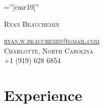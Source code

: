 \documentclass[a4paper, 9pt]{article} %
\begin{document}
\pagestyle{empty} %

\font\fb=''[cmr10]'' %

\vspace{-10pt}
\par{\huge \textsc{Ryan Beauchemin}\par}
\textsc{\href{mailto:ryan.w.beauchemin@gmail.com}{ryan.w.beauchemin@gmail.com}}\\
\textsc{Charlotte, North Carolina} \\
+1 (919) 628 6854\\

\vspace{-10pt}
\section{Experience} %
\end{document}
